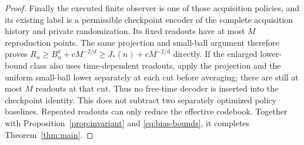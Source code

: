 \begin{proof}
Finally the executed finite observer is one of those acquisition policies, and its existing label is a permissible checkpoint encoder of the complete acquisition history and private randomization. Its fixed readouts have at most $M$ reproduction points. The same projection and small-ball argument therefore proves $R_n\ge B_n^\pi+cM^{-2/d}\ge J_*(n)+cM^{-2/d}$ directly. If the enlarged lower-bound class also uses time-dependent readouts, apply the projection and the uniform small-ball lower separately at each cut before averaging; there are still at most $M$ readouts at that cut. Thus no free-time decoder is inserted into the checkpoint identity. This does not subtract two separately optimized policy baselines. Repeated readouts can only reduce the effective codebook. Together with Proposition~\ref{prop:invariant} and \eqref{eq:bias-bounds}, it completes Theorem~\ref{thm:main}.
\end{proof}
